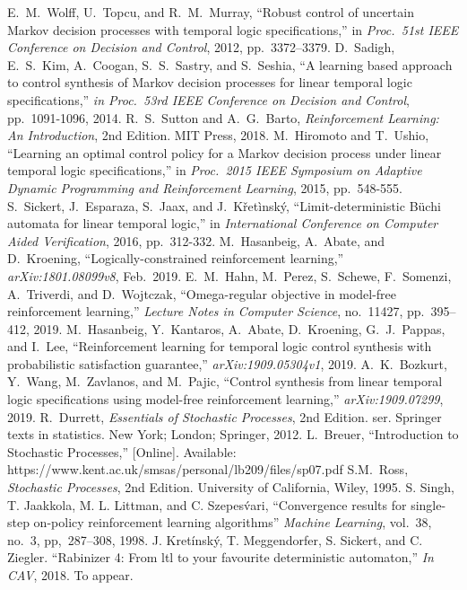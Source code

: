 \documentclass[letterpaper, 10 pt, conference]{ieeeconf}  %
\begin{document}
\begin{thebibliography}{99}
E.\ M.\ Wolff, U.\ Topcu, and R.\ M.\ Murray,
``Robust control of uncertain Markov decision processes with temporal logic specifications,''
in \textit{Proc.\ 51st IEEE Conference on Decision and Control}, 2012, pp.\ 3372--3379.
D.\ Sadigh, E.\ S.\ Kim, A.\ Coogan, S.\ S.\ Sastry, and S.\ Seshia,
``A learning based approach to control synthesis of Markov decision processes for linear temporal logic specifications,''
\textit{in Proc.\ 53rd IEEE Conference on Decision and Control}, pp.\ 1091-1096, 2014.
R.\ S.\ Sutton and A.\ G.\ Barto,
\textit{Reinforcement Learning: An Introduction}, 2nd Edition.
MIT Press, 2018.
M.\ Hiromoto and T.\ Ushio,
``Learning an optimal control policy for a Markov decision process under linear temporal logic specifications,''
in \textit{Proc.\ 2015 IEEE Symposium on Adaptive Dynamic Programming and Reinforcement Learning}, 2015, pp.\ 548-555.
S.\ Sickert, J.\ Esparaza, S.\ Jaax, and J.\ K\v{r}et\`{i}nsk\'{y},
``Limit-deterministic B\"{u}chi automata for linear temporal logic,''
 in \textit{International Conference on Computer Aided Verification}, 2016, pp.\ 312-332.
M.\ Hasanbeig, A.\ Abate, and D.\ Kroening,
``Logically-constrained reinforcement learning,'' \textit{arXiv:1801.08099v8}, Feb.\ 2019.
E.\ M.\ Hahn, M.\ Perez, S.\ Schewe, F.\ Somenzi, A.\ Triverdi, and D.\ Wojtczak,
``Omega-regular objective in model-free reinforcement learning,''
\textit{Lecture Notes in Computer Science}, no.\ 11427, pp.\ 395--412, 2019.
M.\ Hasanbeig, Y.\ Kantaros, A.\ Abate, D.\ Kroening, G.\ J.\ Pappas, and I.\ Lee,
``Reinforcement learning for temporal logic control synthesis with probabilistic satisfaction guarantee,''
\textit{arXiv:1909.05304v1}, 2019.
A.\ K.\ Bozkurt, Y.\ Wang, M.\ Zavlanos, and M.\ Pajic,
``Control synthesis from linear temporal logic specifications using model-free reinforcement learning,''
\textit{arXiv:1909.07299}, 2019.
R.\ Durrett,
\textit{Essentials of Stochastic Processes}, 2nd Edition. ser. Springer texts in statistics. New York; London; Springer, 2012.
L.\ Breuer,
``Introduction to Stochastic Processes,'' [Online]. Available: https://www.kent.ac.uk/smsas/personal/lb209/files/sp07.pdf
S.M.\ Ross,
\textit{Stochastic Processes}, 2nd Edition. University of California, Wiley, 1995.
S. Singh, T. Jaakkola, M. L. Littman, and C. Szepes\'{v}ari,
``Convergence results for single-step on-policy reinforcement learning algorithms'' \textit{Machine Learning},
vol.~38, no.~3, pp,~287--308, 1998.
J. Kretínsk\'{y}, T. Meggendorfer, S. Sickert, and C. Ziegler. ``Rabinizer 4: From ltl to
your favourite deterministic automaton,'' \textit{In CAV}, 2018. To appear.

\end{thebibliography}
\end{document}
